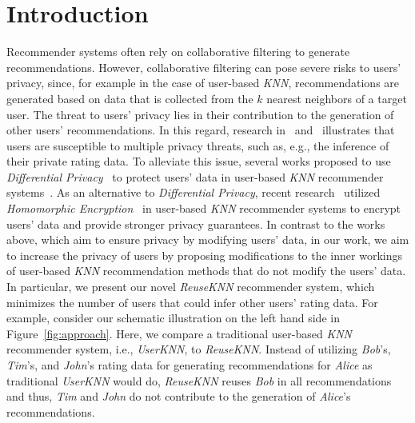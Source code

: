 \documentclass[manuscript,review,anonymous]{acmart}
\begin{document}
\maketitle

\section{Introduction}
Recommender systems often rely on collaborative filtering to generate recommendations.
However, collaborative filtering can pose severe risks to users' privacy, since, for example in the case of user-based \emph{KNN}, recommendations are generated based on data that is collected from the $k$ nearest neighbors of a target user.
The threat to users' privacy lies in their contribution to the generation of other users' recommendations.
In this regard, research in~\cite{ramakrishnan2001being} and~\cite{calandrino2011you} illustrates that users are susceptible to multiple privacy threats, such as, e.g., the inference of their private rating data. 
To alleviate this issue, several works proposed to use \emph{Differential Privacy}~\cite{dwork2014algorithmic} to protect users' data in user-based \emph{KNN} recommender systems~\cite{zhu2014effective,lu2015security}.
As an alternative to \emph{Differential Privacy}, recent research~\cite{badsha2017privacy,zhang2021privacy} utilized \emph{Homomorphic Encryption}~\cite{gentry2009fully} in user-based \emph{KNN} recommender systems to encrypt users' data and provide stronger privacy guarantees. 
In contrast to the works above, which aim to ensure privacy by modifying users' data, in our work, we aim to increase the privacy of users by proposing modifications to the inner workings 
of user-based \emph{KNN} recommendation methods that do not modify the users' data. 
In particular, we present our novel \emph{ReuseKNN} recommender system, which minimizes the number of users that could infer other users' rating data.
For example, consider our schematic illustration on the left hand side in Figure~\ref{fig:approach}.
Here, we compare a traditional user-based \emph{KNN} recommender system, i.e., \emph{UserKNN}, to \emph{ReuseKNN}.
Instead of utilizing \emph{Bob}'s, \emph{Tim}'s, and \emph{John}'s rating data for generating recommendations for \emph{Alice} as traditional \emph{UserKNN} would do, \emph{ReuseKNN} reuses \emph{Bob} in all recommendations and thus, \emph{Tim} and \emph{John} do not contribute to the generation of \emph{Alice}'s recommendations.
\end{document}

